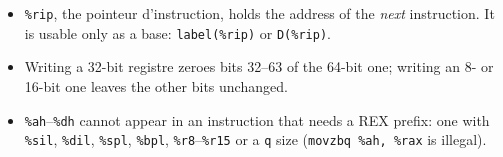 \begin{itemize}[nosep, leftmargin=10pt]
  \item \texttt{\%rip}, the pointeur d'instruction, holds the address of the
    \emph{next} instruction. It is usable only as a base: \texttt{label(\%rip)} or \texttt{D(\%rip)}.
  \item Writing a 32-bit registre zeroes bits 32--63 of the 64-bit one; writing an
    8- or 16-bit one leaves the other bits unchanged.
  \item \texttt{\%ah}--\texttt{\%dh} cannot appear in an instruction that needs a REX prefix: one
    with \texttt{\%sil}, \texttt{\%dil}, \texttt{\%spl}, \texttt{\%bpl}, \texttt{\%r8}--\texttt{\%r15} or a
    \texttt{q} size (\mbox{\texttt{movzbq \%ah, \%rax}} is illegal).
\end{itemize}

